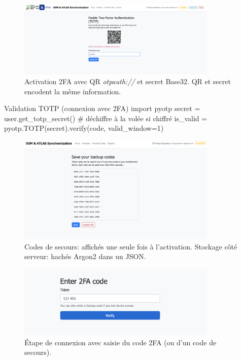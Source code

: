 \begin{figure}[H]
  \centering
  \includegraphics[width=0.85\textwidth]{../figures/chap10/enable_up2fa.png}
  \caption[Activation 2FA]{Activation 2FA avec QR \textit{otpauth://} et secret Base32. QR et secret encodent la même information.}
\end{figure}

\begin{codebox}[language=Python]{Validation TOTP (connexion avec 2FA)}
import pyotp
secret = user.get_totp_secret()  # déchiffre à la volée si chiffré
is_valid = pyotp.TOTP(secret).verify(code, valid_window=1)
\end{codebox}

\begin{figure}[H]
  \centering
  \includegraphics[width=0.85\textwidth]{../figures/chap10/backupcodes.png}
  \caption[Codes de secours]{Codes de secours: affichés une seule fois à l'activation. Stockage côté serveur: hachés Argon2 dans un JSON.}
\end{figure}

\begin{figure}[H]
  \centering
  \includegraphics[width=0.85\textwidth]{../figures/chap10/enter2FA.png}
  \caption[Saisie 2FA]{Étape de connexion avec saisie du code 2FA (ou d'un code de secours).}
\end{figure}

